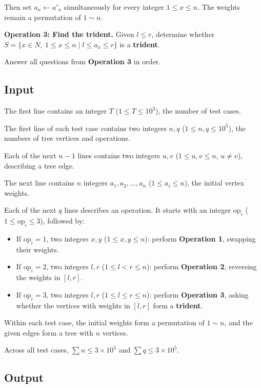 Then set $a_x\leftarrow a'_x$ simultaneously for every integer $1 \le x \le n$. The weights remain a permutation of $1 \sim n$.

\textbf{Operation 3: Find the trident.} Given $l \le r$, determine whether $S=\{x\in N,\ 1\le x\le n\mid l\le a_x\le r\}$ is a \textbf{trident}.

Answer all questions from \textbf{Operation 3} in order.

\subsection{Input}

The first line contains an integer $T$ ($1 \le T \le 10^3$), the number of test cases.

The first line of each test case contains two integers $n,q$ ($1 \le n,q \le 10^5$), the numbers of tree vertices and operations.

Each of the next $n-1$ lines contains two integers $u,v$ ($1 \le u,v \le n$, $u\ne v$), describing a tree edge.

The next line contains $n$ integers $a_1,a_2,\ldots,a_n$ ($1 \le a_i \le n$), the initial vertex weights.

Each of the next $q$ lines describes an operation. It starts with an integer $\text{op}_i$ ($1 \le \text{op}_i \le 3$), followed by:

\begin{itemize}
	\item If $\text{op}_i=1$, two integers $x,y$ ($1 \le x,y \le n$): perform \textbf{Operation 1}, swapping their weights.
	\item If $\text{op}_i=2$, two integers $l,r$ ($1 \le l<r \le n$): perform \textbf{Operation 2}, reversing the weights in $[l,r]$.
	\item If $\text{op}_i=3$, two integers $l,r$ ($1 \le l \le r \le n$): perform \textbf{Operation 3}, asking whether the vertices with weights in $[l,r]$ form a \textbf{trident}.
\end{itemize}

Within each test case, the initial weights form a permutation of $1\sim n$, and the given edges form a tree with $n$ vertices.

Across all test cases, $\sum n \le 3 \times 10^5$ and $\sum q \le 3 \times 10^5$.

\subsection{Output}

